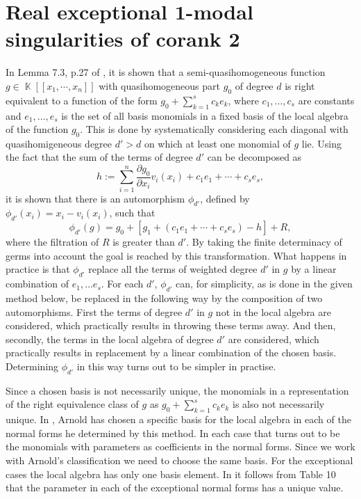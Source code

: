 \documentclass[noend]{amsproc}
\theoremstyle{definition}
\DeclareMathOperator{\K}{\mathbb{K}}
\begin{document}
\section{Real exceptional $\mathbf 1$-modal singularities of corank $\mathbf 2$}
\label{ExceptionalSingularities}
In Lemma 7.3, p.27 of \citet{A1974}, it is shown that a semi-quasihomogeneous function $g\in\K[[x_1,\cdots,x_n]]$ with quasihomogeneous part $g_0$ of degree $d$ is right equivalent to a function of the form $g_0+\sum_{k=1}^s c_ke_k$, where $c_1,\ldots, c_s$ are constants and $e_1,\ldots,e_s$ is the set of all basis monomials in a fixed basis of the local algebra of the function $g_0$. This is done by systematically considering each diagonal with quasihomigeneous degree $d'>d$ on which at least one monomial of $g$ lie. Using the fact that the sum of the terms of degree $d'$ can be decomposed as
\[h:=\sum_{i=1}^n\frac{\partial g_0}{\partial x_i}v_i(x_i)+c_1e_1+\cdots+c_se_s,\]
it is shown that there is an automorphism $\phi_{d'}$, defined by $\phi_{d'}(x_i)=x_i-v_i(x_i)$, such that
\[\phi_{d'}(g)=g_0+[g_1+(c_1e_1+\cdots +c_se_s)-h]+R,\]
where the filtration of $R$ is greater than $d'$. By taking the finite determinacy of germs into account the goal is reached by this transformation. What happens in practice is that $\phi_{d'}$ replace all the terms of weighted degree $d'$ in $g$ by a linear combination of $e_1,\ldots e_s$. For each $d'$, $\phi_{d'}$ can, for simplicity, as is done in the given method below, be replaced in the following way by the composition of two automorphisms. First the terms of degree $d'$ in $g$ not in the local algebra are considered, which practically results in throwing these terms away. And then, secondly, the terms in the local algebra of degree $d'$ are considered, which practically results in replacement by a linear combination of the chosen basis. Determining $\phi_{d'}$ in this way turns out to be simpler in practise.

Since a chosen basis is not necessarily unique, the monomials in a representation of the right equivalence class of $g$ as $g_0+\sum_{k=1}^s c_ke_k$ is also not necessarily unique. In \cite{A1974}, Arnold has chosen a specific basis for the local algebra in each of the normal forms he determined by this method. In each case that turns out to be the monomials with parameters as coefficients in the normal forms. Since we work with Arnold's classification we need to choose the same basis. For the exceptional cases the local algebra has only one basis element. In \cite{realclassify2} it follows from Table 10 that the parameter in each of the exceptional normal forms has a unique value. 
\end{document}
